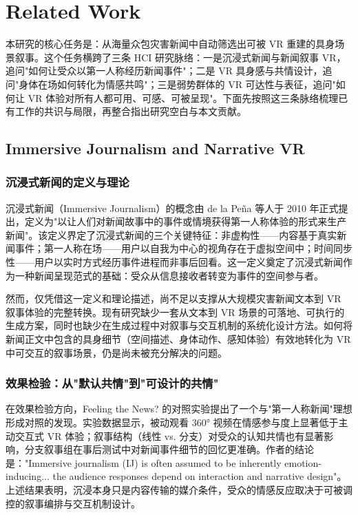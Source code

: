\section{Related Work}

本研究的核心任务是：从海量众包灾害新闻中自动筛选出可被 VR 重建的具身场景叙事。这个任务横跨了三条 HCI 研究脉络：一是沉浸式新闻与新闻叙事 VR，追问"如何让受众以第一人称经历新闻事件"；二是 VR 具身感与共情设计，追问"身体在场如何转化为情感共鸣"；三是弱势群体的 VR 可达性与表征，追问"如何让 VR 体验对所有人都可用、可感、可被呈现"。下面先按照这三条脉络梳理已有工作的共识与局限，再整合指出研究空白与本文贡献。

\subsection{Immersive Journalism and Narrative VR}

\subsubsection{沉浸式新闻的定义与理论}

沉浸式新闻（Immersive Journalism）的概念由 de la Peña 等人于 2010 年正式提出，定义为"以让人们对新闻故事中的事件或情境获得第一人称体验的形式来生产新闻"\cite{delapena2010immersive}。该定义界定了沉浸式新闻的三个关键特征：非虚构性——内容基于真实新闻事件；第一人称在场——用户以自我为中心的视角存在于虚拟空间中；时间同步性——用户以实时方式经历事件进程而非事后回看。这一定义奠定了沉浸式新闻作为一种新闻呈现范式的基础：受众从信息接收者转变为事件的空间参与者。

然而，仅凭借这一定义和理论描述，尚不足以支撑从大规模灾害新闻文本到 VR 叙事体验的完整转换。现有研究缺少一套从文本到 VR 场景的可落地、可执行的生成方案，同时也缺少在生成过程中对叙事与交互机制的系统化设计方法。如何将新闻正文中包含的具身细节（空间描述、身体动作、感知体验）有效地转化为 VR 中可交互的叙事场景，仍是尚未被充分解决的问题。

\subsubsection{效果检验：从"默认共情"到"可设计的共情"}

在效果检验方向，Feeling the News? 的对照实验提出了一个与"第一人称新闻"理想形成对照的发现。实验数据显示，被动观看 360° 视频在情感参与度上显著低于主动交互式 VR 体验；叙事结构（线性 vs. 分支）对受众的认知共情也有显著影响，分支叙事组在事后测试中对新闻事件细节的回忆更准确。作者的结论是："Immersive journalism (IJ) is often assumed to be inherently emotion-inducing... the audience responses depend on interaction and narrative design"\cite{feelingnews2023}。上述结果表明，沉浸本身只是内容传输的媒介条件，受众的情感反应取决于可被调控的叙事编排与交互机制设计。


